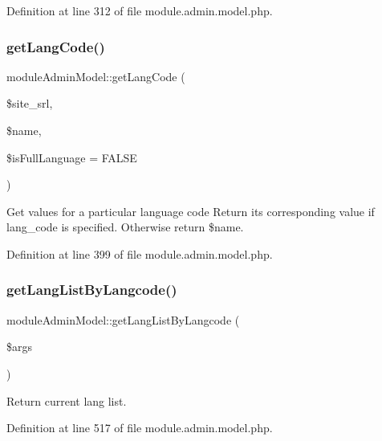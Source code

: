 Definition at line 312 of file module.\+admin.\+model.\+php.

\mbox{\label{classmoduleAdminModel_aa10dc8b8645165816c43f140c57b546b}} 
\subsubsection{\texorpdfstring{get\+Lang\+Code()}{getLangCode()}}
{\footnotesize\ttfamily module\+Admin\+Model\+::get\+Lang\+Code (\begin{DoxyParamCaption}\item[{}]{\$site\+\_\+srl,  }\item[{}]{\$name,  }\item[{}]{\$is\+Full\+Language = {\ttfamily FALSE} }\end{DoxyParamCaption})}



Get values for a particular language code Return its corresponding value if lang\+\_\+code is specified. Otherwise return \$name. 



Definition at line 399 of file module.\+admin.\+model.\+php.

\mbox{\label{classmoduleAdminModel_a425b28af6d0f27c2306191d7a4abdbaa}} 
\subsubsection{\texorpdfstring{get\+Lang\+List\+By\+Langcode()}{getLangListByLangcode()}}
{\footnotesize\ttfamily module\+Admin\+Model\+::get\+Lang\+List\+By\+Langcode (\begin{DoxyParamCaption}\item[{}]{\$args }\end{DoxyParamCaption})}



Return current lang list. 



Definition at line 517 of file module.\+admin.\+model.\+php.


